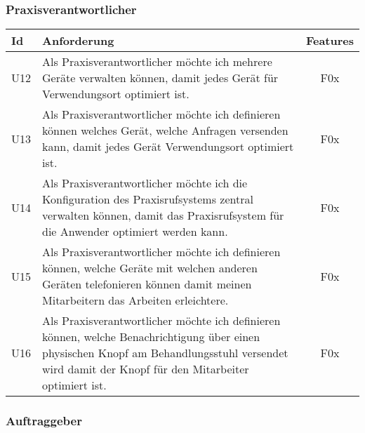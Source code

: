 \clearpage

\subsubsection*{Praxisverantwortlicher}

\begin{table}[h]
    \centering
    \begin{tabular}{|l|p{13cm}|c|}
        \hline
        \textbf{Id} & \textbf{Anforderung}                                                                                                                                                     & \textbf{Features} \\
        \hline
        U12         & Als Praxisverantwortlicher möchte ich mehrere Geräte verwalten können, damit jedes Gerät für Verwendungsort optimiert ist. & F0x \\
        \hline
        U13         & Als Praxisverantwortlicher möchte ich definieren können welches Gerät, welche Anfragen versenden kann, damit jedes Gerät Verwendungsort optimiert ist. & F0x \\
        \hline
        U14         & Als Praxisverantwortlicher möchte ich die Konfiguration des Praxisrufsystems zentral verwalten können, damit das Praxisrufsystem für die Anwender optimiert werden kann. & F0x \\
        \hline
        U15         & Als Praxisverantwortlicher möchte ich definieren können, welche Geräte mit welchen anderen Geräten telefonieren können damit meinen Mitarbeitern das Arbeiten erleichtere. & F0x \\
        \hline
        U16         & Als Praxisverantwortlicher möchte ich definieren können, welche Benachrichtigung über einen physischen Knopf am Behandlungsstuhl versendet wird damit der Knopf für den Mitarbeiter optimiert ist. & F0x \\
        \hline
    \end{tabular}\label{tab:userstories2}
\end{table}


\clearpage

\subsubsection*{Auftraggeber}\label{subsec:auftraggeber}

